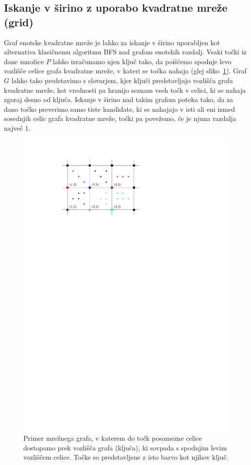 \documentclass[a4paper, 12pt]{book}
\begin{document}
\subsection{Iskanje v širino z uporabo kvadratne mreže (grid)}
\label{grid-chapter}
Graf enotske kvadratne mreže je lahko za iskanje v širino uporabljen kot alternativa klasičnemu algoritmu BFS nad grafom enotskih razdalj. Vsaki točki iz dane množice $P$ lahko izračunamo njen ključ tako, da poiščemo spodnje levo vozlišče celice grafa kvadratne mreže, v kateri se točka nahaja (glej sliko~\ref{grid-fig}). Graf $G$ lahko tako predstavimo s slovarjem, kjer ključi predstavljajo vozlišča grafa kvadratne mreže, kot vrednosti pa hranijo seznam vseh točk v celici, ki se nahaja zgoraj desno od ključa. Iskanje v širino nad takim grafom poteka tako, da za dano točko preverimo samo tiste kandidate, ki se nahajajo v isti ali eni izmed sosednjih celic grafa kvadratne mreže, točki pa povežemo, če je njuna razdalja največ 1.

\begin{figure}[htp]
\centerline{\includegraphics[scale=1.2]{pics/grid.pdf}}
\caption{Primer mrežnega grafa, v katerem do točk posamezne celice dostopamo prek vozlišča grafa (ključa), ki sovpada s spodnjim levim vozliščem celice. Točke so predstavljene z isto barvo kot njihov ključ.}
\label{grid-fig}
\end{figure}
\end{document}
